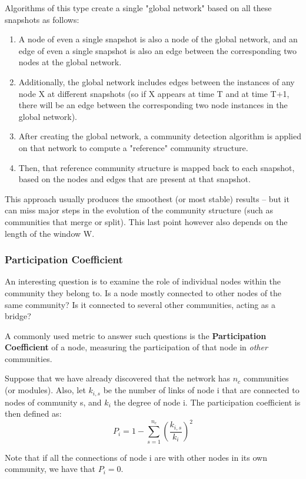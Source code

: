 \documentclass[11pt]{scrartcl} %
\begin{document}
Algorithms of this type create a single "global network" based on all these snapshots as follows:
\begin{enumerate}
	\item A node of even a single snapshot is also a node of the global network, and an edge of even a single snapshot is also an edge between the corresponding two nodes at the global network.
	\item Additionally, the global network includes edges between the instances of any node X at different snapshots (so if X appears at time T and at time T+1, there will be an edge between the corresponding two node instances in the global network).
	\item After creating the global network, a community detection algorithm is applied on that network to compute a "reference" community structure.
	\item Then, that reference community structure is mapped back to each snapshot, based on the nodes and edges that are present at that snapshot.
\end{enumerate}
This approach usually produces the smoothest (or most stable) results – but it can miss major steps in the evolution of the community structure (such as communities that merge or split). This last point however also depends on the length of the window W.

\subsubsection{Participation Coefficient}
An interesting question is to examine the role of individual nodes within the community they belong to. Is a node mostly connected to other nodes of the same community? Is it connected to several other communities, acting as a bridge? 

A commonly used metric to answer such questions is the \textbf{Participation Coefficient} of a node, measuring the participation of that node in \emph{other} communities.

Suppose that we have already discovered that the network has $n_c$ communities (or modules). Also, let $k_{i,s}$ be the number of links of node i that are connected to nodes of community s, and $k_i$ the degree of node i. The participation coefficient is then defined as:
\[ P_i = 1 - \sum_{s=1}^{n_c} \left(\frac{k_{i,s}}{k_i}\right)^2 \]

Note that if all the connections of node i are with other nodes in its own community, we have that $P_i=0$. 
\end{document}
